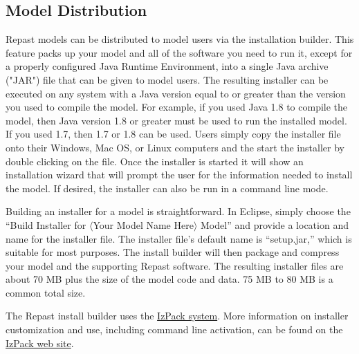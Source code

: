 \documentclass[11pt]{amsart}
\begin{document}
\subsection{Model Distribution}

Repast models can be distributed to model users via the installation builder. This feature packs up your model and all of the software you need to run it, except for a properly configured Java Runtime Environment, into a single Java archive ("JAR") file that can be given to model users. The resulting installer can be executed on any system with a Java version equal to or greater than the version you used to compile the model.  For example, if you used Java 1.8 to compile the model, then Java version 1.8 or greater must be used to run the installed model. If you used 1.7, then 1.7 or 1.8 can be used. Users simply copy the installer file onto their Windows, Mac OS, or Linux computers and the start the installer by double clicking on the file. Once the installer is started it will show an installation wizard that will prompt the user for the information needed to install the model. If desired, the installer can also be run in a command line mode.

Building an installer for a model is straightforward. In Eclipse, simply choose the ``Build Installer for $\langle$Your Model Name Here$\rangle$ Model'' and provide a location and name for the installer file. The installer file's default name is ``setup.jar,'' which is suitable for most purposes. The install builder will then package and compress your model and the supporting Repast software. The resulting installer files are about 70 MB plus the size of the model code and data. 75 MB to 80 MB is a common total size.

The Repast install builder uses the \href{http://izpack.org/}{IzPack system}.  More information on installer customization and use, including command line activation, can be found on the  \href{http://izpack.org/}{IzPack web site}.

\noindent\begin{minipage}[h]{\textwidth}
\vspace{.2in}
\lstset{language=java,caption=}
\begin{lstlisting}

\end{lstlisting}
\vspace{.2in}
\end{minipage}
\end{document}

